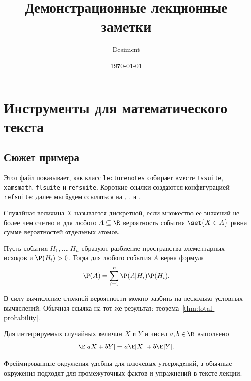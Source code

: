 \documentclass{lecturenotes}
\title{Демонстрационные лекционные заметки}
\author{Desiment}
\date{\today}
\begin{document}
\maketitle
\tableofcontents

\chapter{Инструменты для математического текста}

\section{Сюжет примера}
\label{sec:story}

Этот файл показывает, как класс \texttt{lecturenotes} собирает вместе
\texttt{tssuite}, \texttt{xamsmath}, \texttt{flsuite} и \texttt{refsuite}.
Короткие ссылки создаются конфигурацией \texttt{refsuite}: далее мы будем
ссылаться на , ,
 и .

\begin{definition}[note=Дискретная случайная величина,label=def:random-variable]
Случайная величина $X$ называется дискретной, если множество ее значений не
более чем счетно и для любого $A \subseteq \R$ вероятность события
$\set{X \in A}$ равна сумме вероятностей отдельных атомов.
\end{definition}

\begin{Theorem}
Пусть события $H_1,\dots,H_n$ образуют разбиение пространства элементарных
исходов и $\P(H_i)>0$. Тогда для любого события $A$ верна формула
\[
  \P(A)=\sum_{i=1}^n \P(A | H_i)\P(H_i).
\]
\end{Theorem}

В силу  вычисление сложной вероятности можно
разбить на несколько условных вычислений. Обычная ссылка на тот же результат:
теорема~\ref{thm:total-probability}.

\begin{Lemma}
Для интегрируемых случайных величин $X$ и $Y$ и чисел $a,b\in\R$ выполнено
\[
  \E[aX+bY] = a\E[X] + b\E[Y].
\]
\end{Lemma}

\begin{remark}
Фреймированные окружения удобны для ключевых утверждений, а обычные окружения
подходят для промежуточных фактов и упражнений в тексте лекции.
\end{remark}
\end{document}
